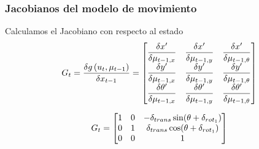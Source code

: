 \begin{frame}
    \frametitle{Jacobianos del modelo de movimiento}
    Calculamos el Jacobiano con respecto al estado
    \begin{equation*}
        G_{t} = \dfrac{\delta g\left( u_{t},\mu_{t-1} \right)}{\delta x_{t-1}} =
        \begin{bmatrix}
            \dfrac{\delta x^{\prime}}{\delta \mu_{t-1,x}} & \dfrac{\delta x^{\prime}}{\delta \mu_{t-1,y}} & \dfrac{\delta x^{\prime}}{\delta \mu_{t-1,\theta}}\\
            \dfrac{\delta y^{\prime}}{\delta \mu_{t-1,x}} & \dfrac{\delta y^{\prime}}{\delta \mu_{t-1,y}} & \dfrac{\delta y^{\prime}}{\delta \mu_{t-1,\theta}}\\
            \dfrac{\delta \theta^{\prime}}{\delta \mu_{t-1,x}} & \dfrac{\delta \theta^{\prime}}{\delta \mu_{t-1,y}} & \dfrac{\delta \theta^{\prime}}{\delta \mu_{t-1,\theta}}\\
        \end{bmatrix}
    \end{equation*}

    \begin{equation*}
    G_{t} = 
    \begin{bmatrix}
        1 & 0 & -\delta_{trans} \sin(\theta + \delta_{rot_{1}})\\
        0 & 1 & \delta_{trans} \cos(\theta + \delta_{rot_{1}})\\
        0 & 0 & 1\\
    \end{bmatrix}
    \end{equation*}
\end{frame}

